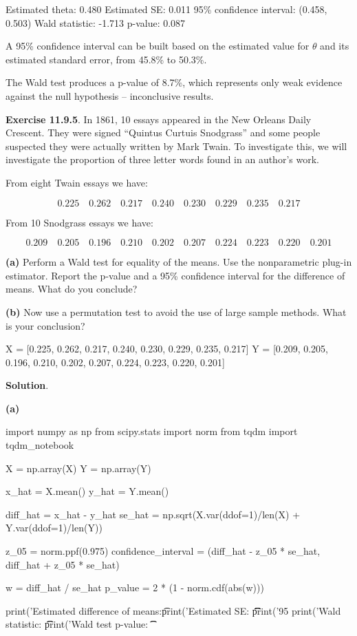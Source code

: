 \begin{console}
Estimated theta:         0.480
Estimated SE:            0.011
95\% confidence interval: (0.458, 0.503)
Wald statistic:          -1.713
p-value:                 0.087
\end{console}

A 95\% confidence interval can be built based on the estimated value for
\(\theta\) and its estimated standard error, from 45.8\% to 50.3\%.

The Wald test produces a p-value of 8.7\%, which represents only weak
evidence against the null hypothesis -- inconclusive results.

\textbf{Exercise 11.9.5}. In 1861, 10 essays appeared in the New Orleans
Daily Crescent. They were signed ``Quintus Curtuis Snodgrass'' and some
people suspected they were actually written by Mark Twain. To
investigate this, we will investigate the proportion of three letter
words found in an author's work.

From eight Twain essays we have:

\[ 
0.225 \quad 0.262 \quad 0.217 \quad 0.240 \quad 0.230 \quad 0.229 \quad 0.235 \quad 0.217
\]

From 10 Snodgrass essays we have:

\[
0.209 \quad 0.205 \quad 0.196 \quad 0.210 \quad 0.202 \quad 0.207 \quad 0.224 \quad 0.223 \quad 0.220 \quad 0.201
\]


\textbf{(a)} Perform a Wald test for equality of the means. Use the
nonparametric plug-in estimator. Report the p-value and a 95\%
confidence interval for the difference of means. What do you conclude?

\textbf{(b)} Now use a permutation test to avoid the use of large sample
methods. What is your conclusion?

\begin{python}
X = [0.225, 0.262, 0.217, 0.240, 0.230, 0.229, 0.235, 0.217]
Y = [0.209, 0.205, 0.196, 0.210, 0.202, 0.207, 0.224, 0.223, 0.220, 0.201]
\end{python}

\textbf{Solution}.

\textbf{(a)}

\begin{python}
import numpy as np
from scipy.stats import norm
from tqdm import tqdm_{n}otebook

X = np.array(X)
Y = np.array(Y)

x_hat = X.mean()
y_hat = Y.mean()

diff_hat = x_hat - y_hat
se_hat = np.sqrt(X.var(ddof=1)/len(X) + Y.var(ddof=1)/len(Y))

z_{0}5 = norm.ppf(0.975)
confidence_{i}nterval = (diff_hat - z_{0}5 * se_hat, diff_hat + z_{0}5 * se_hat)

w = diff_hat / se_hat
p_value = 2 * (1 - norm.cdf(abs(w)))

print('Estimated difference of means:\t %
print('Estimated SE: \t\t\t %
print('95%
print('Wald statistic: \t\t %
print('Wald test p-value: \t\t %
\end{python}

